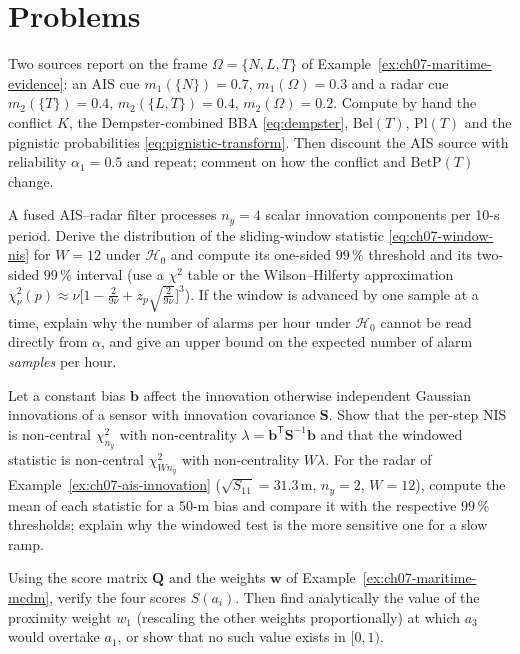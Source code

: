 \documentclass[graybox,envcountchap]{style/SNmono}
\newcommand{\problemsection}{\section*{Problems}\addcontentsline{toc}{section}{Problems}}
\providecommand{\DIFadd}[1]{{\protect\color{blue} #1}} %
\providecommand{\DIFdel}[1]{{\protect\color{red} #1}} %
\providecommand{\DIFaddbegin}{} %
\providecommand{\DIFaddend}{} %
\providecommand{\DIFdelbegin}{} %
\providecommand{\DIFdelend}{} %
\begin{document}
\problemsection
\begin{prob}\label{prob:ch07:1}
Two sources report on the frame $\Omega=\{N,L,T\}$ of Example~\ref{ex:ch07-maritime-evidence}: an AIS cue $m_1(\{N\})=0.7$, $m_1(\Omega)=0.3$ and a radar cue $m_2(\{T\})=0.4$, $m_2(\{L,T\})=0.4$, $m_2(\Omega)=0.2$. Compute by hand the conflict $K$, the Dempster-combined BBA \eqref{eq:dempster}, $\mathrm{Bel}(T)$, $\mathrm{Pl}(T)$ and the pignistic probabilities \eqref{eq:pignistic-transform}. Then discount the AIS source with reliability $\alpha_1=0.5$ and repeat; comment on how the conflict and $\mathrm{BetP}(T)$ change.
\end{prob}
\begin{prob}\label{prob:ch07:2}
A fused AIS--radar filter processes $n_y=4$ scalar innovation components per 10-s period. Derive the distribution of the sliding-window statistic \eqref{eq:ch07-window-nis} for $W=12$ under $\mathcal{H}_0$ and compute its one-sided $99\,\%$ threshold and its two-sided $99\,\%$ interval (use a $\chi^{2}$ table or the Wilson--Hilferty approximation $\chi^{2}_{\nu}(p)\approx\nu\bigl[1-\tfrac{2}{9\nu}+z_p\sqrt{\tfrac{2}{9\nu}}\bigr]^{3}$). If the window is advanced by one sample at a time, explain why the number of alarms per hour under $\mathcal{H}_0$ cannot be read directly from $\alpha$, and give an upper bound on the expected number of alarm \emph{samples} per hour.
\end{prob}
\begin{prob}\label{prob:ch07:3}
Let a constant bias $\mathbf{b}$ affect \DIFdelbegin \DIFdel{the innovation }\DIFdelend \DIFaddbegin \DIFadd{otherwise independent Gaussian innovations }\DIFaddend of a sensor with innovation covariance $\mathbf{S}$. Show that the per-step NIS is non-central $\chi^{2}_{n_y}$ with non-centrality $\lambda=\mathbf{b}^{\mathsf T}\mathbf{S}^{-1}\mathbf{b}$ and that the windowed statistic is non-central $\chi^{2}_{Wn_y}$ with non-centrality $W\lambda$. For the radar of Example~\ref{ex:ch07-ais-innovation} ($\sqrt{S_{11}}=31.3$\,m, $n_y=2$, $W=12$), compute the mean of each statistic for a $50$-m bias and compare it with the respective $99\,\%$ thresholds; explain why the windowed test is the more sensitive one for a slow ramp.
\end{prob}
\begin{prob}\label{prob:ch07:4}
Using the score matrix $\mathbf{Q}$ and the weights $\mathbf{w}$ of Example~\ref{ex:ch07-maritime-mcdm}, verify the four scores $S(a_i)$. Then find analytically the value of the proximity weight $w_1$ (rescaling the other weights proportionally) at which $a_3$ would overtake $a_1$, or show that no such value exists in $[0,1)$.
\end{prob}
\end{document}
